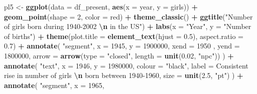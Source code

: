 \documentclass[11pt,a4paper,]{article}
\newenvironment{Shaded}{\begin{snugshade}}{\end{snugshade}}
\newcommand{\AttributeTok}[1]{\textcolor[rgb]{0.13,0.29,0.53}{#1}}
\newcommand{\DecValTok}[1]{\textcolor[rgb]{0.00,0.00,0.81}{#1}}
\newcommand{\FloatTok}[1]{\textcolor[rgb]{0.00,0.00,0.81}{#1}}
\newcommand{\FunctionTok}[1]{\textcolor[rgb]{0.13,0.29,0.53}{\textbf{#1}}}
\newcommand{\NormalTok}[1]{#1}
\newcommand{\OtherTok}[1]{\textcolor[rgb]{0.56,0.35,0.01}{#1}}
\newcommand{\SpecialCharTok}[1]{\textcolor[rgb]{0.81,0.36,0.00}{\textbf{#1}}}
\newcommand{\StringTok}[1]{\textcolor[rgb]{0.31,0.60,0.02}{#1}}
\begin{document}
\tiny

\begin{Shaded}
\begin{Highlighting}[]
\NormalTok{pl5 }\OtherTok{\textless{}{-}} \FunctionTok{ggplot}\NormalTok{(}\AttributeTok{data =}\NormalTok{ df\_present, }\FunctionTok{aes}\NormalTok{(}\AttributeTok{x =}\NormalTok{ year, }\AttributeTok{y =}\NormalTok{ girls)) }\SpecialCharTok{+}
  \FunctionTok{geom\_point}\NormalTok{(}\AttributeTok{shape =} \DecValTok{2}\NormalTok{, }\AttributeTok{color =} \StringTok{\textquotesingle{}red\textquotesingle{}}\NormalTok{) }\SpecialCharTok{+} \FunctionTok{theme\_classic}\NormalTok{() }\SpecialCharTok{+} 
  \FunctionTok{ggtitle}\NormalTok{(}\StringTok{"Number of girls born during 1940{-}2002 }\SpecialCharTok{\textbackslash{}n}\StringTok{ in the US"}\NormalTok{) }\SpecialCharTok{+}
   \FunctionTok{labs}\NormalTok{(}\AttributeTok{x =} \StringTok{"Year"}\NormalTok{, }\AttributeTok{y =} \StringTok{"Number of births"}\NormalTok{) }\SpecialCharTok{+} \FunctionTok{theme}\NormalTok{(}\AttributeTok{plot.title =} \FunctionTok{element\_text}\NormalTok{(}\AttributeTok{hjust =} \FloatTok{0.5}\NormalTok{), }
                                                    \AttributeTok{aspect.ratio =} \FloatTok{0.7}\NormalTok{) }\SpecialCharTok{+}
  \FunctionTok{annotate}\NormalTok{(}
    \StringTok{"segment"}\NormalTok{,}
    \AttributeTok{x =} \DecValTok{1945}\NormalTok{,}
    \AttributeTok{y =} \DecValTok{1900000}\NormalTok{,}
    \AttributeTok{xend =} \DecValTok{1950}\NormalTok{  ,}
    \AttributeTok{yend =} \DecValTok{1800000}\NormalTok{,}
    \AttributeTok{arrow =} \FunctionTok{arrow}\NormalTok{(}\AttributeTok{type =} \StringTok{"closed"}\NormalTok{,}
                  \AttributeTok{length =} \FunctionTok{unit}\NormalTok{(}\FloatTok{0.02}\NormalTok{, }\StringTok{"npc"}\NormalTok{))}
\NormalTok{  ) }\SpecialCharTok{+}
  \FunctionTok{annotate}\NormalTok{(}
    \StringTok{"text"}\NormalTok{,}
    \AttributeTok{x =} \DecValTok{1946}\NormalTok{,}
    \AttributeTok{y =} \DecValTok{1980000}\NormalTok{,}
    \AttributeTok{colour =} \StringTok{"black"}\NormalTok{,}
    \AttributeTok{label =} \StringTok{\textquotesingle{}Consistent rise in number of girls }\SpecialCharTok{\textbackslash{}n}\StringTok{ born between 1940{-}1960\textquotesingle{}}\NormalTok{,}
    \AttributeTok{size =} \FunctionTok{unit}\NormalTok{(}\FloatTok{2.5}\NormalTok{, }\StringTok{"pt"}\NormalTok{)}
\NormalTok{  ) }\SpecialCharTok{+}
  \FunctionTok{annotate}\NormalTok{(}
    \StringTok{"segment"}\NormalTok{,}
    \AttributeTok{x =} \DecValTok{1965}\NormalTok{,}

\end{Highlighting}
\end{Shaded}
\end{document}
